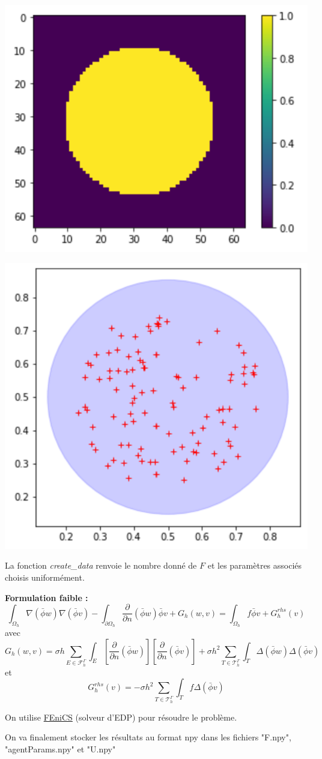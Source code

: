 \begin{minipage}{0.48\linewidth}
	\centering
	\includegraphics[width=0.5\linewidth]{domaine.png}
\end{minipage}
\begin{minipage}{0.48\linewidth}
	\centering
	\includegraphics[width=0.45\linewidth]{parametres.png}
\end{minipage}

La fonction \textit{create\_data} renvoie le nombre donné de $F$ et les paramètres associés choisis uniformément. 

\textbf{Formulation faible :}
$$\int_{\Omega_h}\nabla(\bar{\phi}w)\nabla(\bar{\phi}v)-\int_{\partial\Omega_h}\frac{\partial}{\partial n}(\bar{\phi}w)\bar{\phi}v+G_h(w,v)=\int_{\Omega_h}f\bar{\phi}v+G_h^{rhs}(v)$$
avec
$$G_h(w,v)=\sigma h\sum_{E\in\mathcal{F}_h^\Gamma}\int_E\left[\frac{\partial}{\partial n}(\bar{\phi}w)\right]\left[\frac{\partial}{\partial n}(\bar{\phi}v)\right]+\sigma h^2\sum_{T\in\mathcal{T}_h^\Gamma}\int_T \Delta(\bar{\phi}w)\Delta(\bar{\phi}v)$$
et
$$G_h^{rhs}(v)=-\sigma h^2\sum_{T\in\mathcal{T}_h^\Gamma}\int_T f\Delta(\bar{\phi}v)$$

On utilise \href{https://fenicsproject.org/}{FEniCS} (solveur d'EDP) pour résoudre le problème. 

On va finalement stocker les résultats au format npy dans les fichiers "F.npy", "agentParams.npy" et "U.npy"

\newpage

